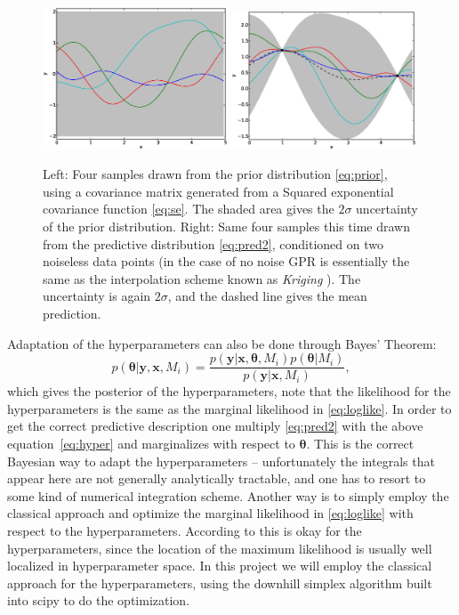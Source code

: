\documentclass[a4paper,11pt,article,oneside]{memoir}
\begin{document}
\begin{figure}[htb]
\centering
\includegraphics[width=0.49\textwidth]{fig3} \includegraphics[width=0.49\textwidth]{fig4}
\caption{Left: Four samples drawn from the prior distribution \eqref{eq:prior}, using a covariance matrix generated from a Squared exponential covariance function \eqref{eq:se}. The shaded area gives the $2\sigma$ uncertainty of the prior distribution. Right: Same four samples this time drawn from the predictive distribution \eqref{eq:pred2}, conditioned on two noiseless data points (in the case of no noise GPR is essentially the same as the interpolation scheme known as \emph{Kriging} \cite[Chapter~3]{press2007}). The uncertainty is again $2\sigma$, and the dashed line gives the mean prediction.}
\label{fig:prediction}
\end{figure}

Adaptation of the hyperparameters can also be done through Bayes' Theorem:
%
\begin{equation}
p(\boldsymbol{\theta}|\mathbf{y},\mathbf{x},M_i) = \frac{p(\mathbf{y}|\mathbf{x},\boldsymbol{\theta},M_i)p(\boldsymbol{\theta}|M_i)}{p(\mathbf{y}|\mathbf{x},M_i)},
\label{eq:hyper}
\end{equation}
%
which gives the posterior of the hyperparameters, note that the likelihood for the hyperparameters is the same as the marginal likelihood in \eqref{eq:loglike}. In order to get the correct predictive description one multiply \eqref{eq:pred2} with the above equation~\eqref{eq:hyper} and marginalizes with respect to $\boldsymbol{\theta}$. This is the correct Bayesian way to adapt the hyperparameters -- unfortunately the integrals that appear here are not generally analytically tractable, and one has to resort to some kind of numerical integration scheme. Another way is to simply employ the classical approach and optimize the marginal likelihood in \eqref{eq:loglike} with respect to the hyperparameters. According to \cite{rasmussen2006} this is okay for the hyperparameters, since the location of the maximum likelihood is usually well localized in hyperparameter space. In this project we will employ the classical approach for the hyperparameters, using the downhill simplex algorithm built into scipy to do the optimization.
\end{document}
